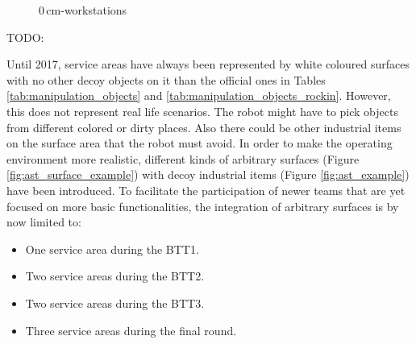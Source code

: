 \begin{figure} [h!]
	\begin{center}
		\missingfigure[figwidth=6cm]{}	
	\end{center}
	\caption{$0\,\text{cm}$-workstations}
	\label{fig:0cmws}
\end{figure}

TODO:

Until 2017, service areas have always been represented by white coloured surfaces with no other decoy objects on it than the official ones in Tables \ref{tab:manipulation_objects} and \ref{tab:manipulation_objects_rockin}.
However, this does not represent real life scenarios.
The robot might have to pick objects from different colored or dirty places. Also there could be other industrial items on the surface area that the robot must avoid.
In order to make the operating environment more realistic, different kinds of arbitrary surfaces (Figure \ref{fig:ast_surface_example}) with decoy industrial items (Figure \ref{fig:ast_example}) have been introduced.
To facilitate the participation of newer teams that are yet focused on more basic functionalities, the integration of arbitrary surfaces is by now limited to:
\begin{itemize}
	\item One service area during the BTT1.
	\item Two service areas during the BTT2.
	\item Two service areas during the BTT3.
	\item Three service areas during the final round.
\end{itemize}

